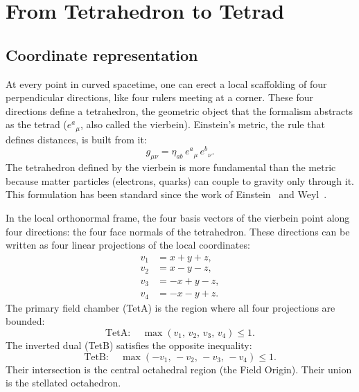 \documentclass[twocolumn]{iopjournal}
\begin{document}
\section{From Tetrahedron to Tetrad}
\label{sec:tetrad}

\subsection{Coordinate representation}

At every point in curved spacetime, one can erect a local scaffolding of four perpendicular directions, like four rulers meeting at a corner. These four directions define a tetrahedron, the geometric object that the formalism abstracts as the tetrad ($e^a{}_\mu$, also called the vierbein). Einstein's metric, the rule that defines distances, is built from it:
\begin{equation}
g_{\mu\nu} = \eta_{ab}\, e^a{}_\mu\, e^b{}_\nu.
\end{equation}
The tetrahedron defined by the vierbein is more fundamental than the metric because matter particles (electrons, quarks) can couple to gravity only through it. This formulation has been standard since the work of Einstein~\cite{Einstein1928} and Weyl~\cite{Weyl1929}.

In the local orthonormal frame, the four basis vectors of the vierbein point along four directions: the four face normals of the tetrahedron. These directions can be written as four linear projections of the local coordinates:
\begin{align}
v_1 &= x + y + z, \nonumber \\
v_2 &= x - y - z, \nonumber \\
v_3 &= -x + y - z, \nonumber \\
v_4 &= -x - y + z.
\end{align}
The primary field chamber (TetA) is the region where all four projections are bounded:
\begin{equation}
\text{TetA}: \quad \max(v_1,\, v_2,\, v_3,\, v_4) \leq 1.
\end{equation}
The inverted dual (TetB) satisfies the opposite inequality:
\begin{equation}
\text{TetB}: \quad \max(-v_1,\, -v_2,\, -v_3,\, -v_4) \leq 1.
\end{equation}
Their intersection is the central octahedral region (the Field Origin). Their union is the stellated octahedron.
\end{document}
